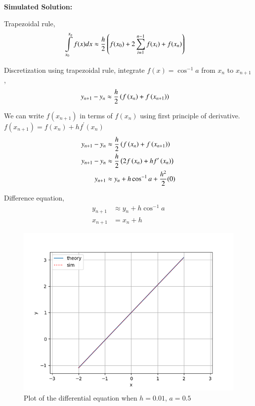\documentclass[journal]{IEEEtran}
\begin{document}
\medskip

\textbf{Simulated Solution:}

Trapezoidal rule,
\begin{align}
    \int\limits_{x_0}^{x_n}f(x)dx &\approx \frac{h}{2} \left(f(x_{0}) + 2 \sum_{i=1}^{n-1} f(x_{i}) + f(x_{n}) \right)
\end{align}

Discretization using trapezoidal rule, integrate $f(x)=\cos^{-1}a$ from $x_{n}$ to $x_{n+1}$,
\begin{align}
    y_{n+1}-y_{n} &\approx \frac{h}{2}\left(f\left(x_{n}\right)+f\left(x_{n+1}\right)\right)
\end{align}
    
We can write $f(x_{n+1})$ in terms of $f(x_n)$ using first principle of derivative. $f(x_{n+1})=f(x_n)+hf^{\prime}(x_n)$
\begin{align}
	y_{n+1}-y_{n} &\approx \frac{h}{2}\left(f\left(x_{n}\right)+f\left(x_{n+1}\right)\right) \\
	y_{n+1}-y_{n} &\approx \frac{h}{2}\left(2f\left(x_{n}\right)+hf^\prime\left(x_{n}\right)\right) \\
    y_{n+1} &\approx y_{n} + h\cos^{-1}a + \frac{h^2}{2}(0)
\end{align}

Difference equation,
\begin{align}
    y_{n+1} &\approx y_{n} + h\cos^{-1}a \\
    x_{n+1} &= x_n + h
\end{align}

\begin{figure}[h]
    \centering
    \includegraphics[width=\columnwidth]{figs/plot.png}
    \caption{Plot of the differential equation when $h=0.01$, $a=0.5$}
    \label{fig:Plot1}
    \end{figure}
\end{document}
